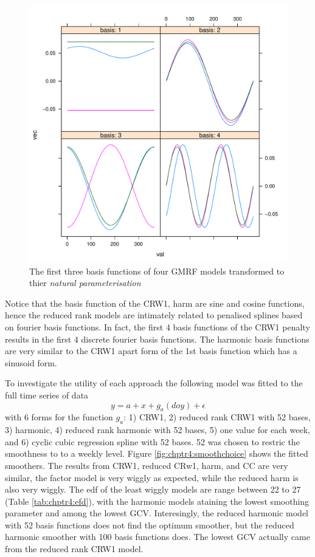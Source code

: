 \begin{figure}
  \centering
  \includegraphics[width=\textwidth]{eigendecomp}
\caption{The first three basis functions of four GMRF models transformed to thier \textit{natural parameterisation}}
\label{fig:chptr4:eigenBasis}
\end{figure}

Notice that the basis function of the CRW1, harm are sine and cosine functions, hence the reduced rank models are intimately related to penalised splines based on fourier basis functions. In fact, the first 4 basis functions of the CRW1 penalty results in the first 4 discrete fourier basis functions. The harmonic basis functions are very similar to the CRW1 apart form of the 1st basis function which has a sinusoid form.

To investigate the utility of each approach the following model was fitted to the full time series of data
\begin{equation}
  y = a + x + g_a(doy) + \epsilon
\end{equation}
with 6 forms for the function $g_a$: 1) CRW1, 2) reduced rank CRW1 with 52 bases, 3) harmonic, 4) reduced rank harmonic with 52 bases, 5) one value for each week, and 6) cyclic cubic regression spline with 52 bases.  52 was chosen to restric the smoothness to to a weekly level. Figure \ref{fig:chptr4:smoothchoice} shows the fitted smoothers.  The results from CRW1, reduced CRw1, harm, and CC are very similar, the factor model is very wiggly as expected, while the reduced harm is also very wiggly.  The edf of the least wiggly models are range between 22 to 27 (Table \ref{tab:chptr4:efd}), with the harmonic models ataining the lowest smoothing parameter and among the lowest GCV.  Interesingly, the reduced harmonic model with 52 basis functions does not find the optimum smoother, but the reduced harmonic smoother with 100 basis functions does.  The lowest GCV actually came from the reduced rank CRW1 model.

